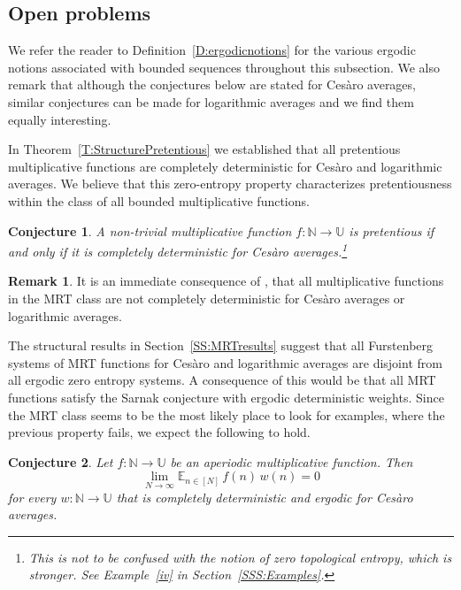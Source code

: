 \documentclass[11pt]{amsart}
\newtheorem{conjecture}{Conjecture}
\theoremstyle{definition}
\newtheorem*{remark}{Remark}
\newcommand{\E}{{\mathbb E}}
\newcommand{\N}{{\mathbb N}}
\newcommand{\U}{{\mathbb U}}
\begin{document}
\subsection{Open problems} \label{SS:Problems}
We refer the reader to Definition~\ref{D:ergodicnotions} for the various ergodic notions associated with bounded sequences throughout this subsection.  We also remark that although the conjectures  below are stated for Ces\`aro averages, similar conjectures can be made for logarithmic averages and we find them  equally interesting.


In Theorem~\ref{T:StructurePretentious} we established that all pretentious multiplicative functions
are completely deterministic for Ces\`aro and logarithmic averages.
We believe that this  zero-entropy property  characterizes pretentiousness within the class of all bounded multiplicative functions.
\begin{conjecture}\label{Con:1}
A non-trivial multiplicative function $f\colon \N\to \U$ is pretentious if and only if it is completely deterministic for Ces\`aro averages.\footnote{This is not to be confused with the notion of zero topological entropy, which  is stronger. See Example~\eqref{iv} in Section~\ref{SSS:Examples}.}
\end{conjecture}
\begin{remark}
	It is an immediate consequence of  \cite[Main Theorem]{GLR21}, that all multiplicative functions in the MRT class are not
	completely deterministic for Ces\`aro averages or logarithmic averages.
\end{remark}
The structural results  in Section~\ref{SS:MRTresults} suggest  that all Furstenberg systems of  MRT
functions for Ces\`aro and logarithmic averages  are disjoint from all ergodic zero entropy systems.
A consequence of this would be that all MRT functions satisfy the  Sarnak conjecture  with ergodic deterministic weights.   Since the MRT class seems to be  the most likely place  to look for examples, where the previous property fails, we expect the following to hold.
\begin{conjecture}\label{Con:2}
Let $f\colon \N\to \U$  be an aperiodic multiplicative function.
Then
$$
\lim_{N\to\infty} \E_{n\in [N]} \, f(n)\, w(n)=0
$$
for every  $w\colon \N\to \U$  that is completely deterministic and ergodic for Ces\`aro averages.

\end{conjecture}
\end{document}
